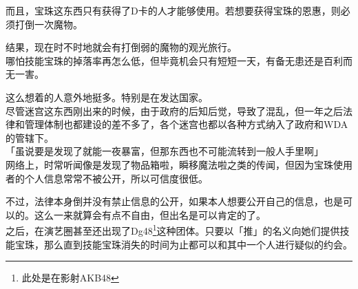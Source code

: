 而且，宝珠这东西只有获得了D卡的人才能够使用。若想要获得宝珠的恩惠，则必须打倒一次魔物。

结果，现在时不时地就会有打倒弱的魔物的观光旅行。\\

哪怕技能宝珠的掉落率再怎么低，但毕竟机会只有短短一天，有备无患还是百利而无一害。

这么想着的人意外地挺多。特别是在发达国家。\\

尽管迷宫这东西刚出来的时候，由于政府的后知后觉，导致了混乱，但一年之后法律和管理体制也都建设的差不多了，各个迷宫也都以各种方式纳入了政府和WDA的管辖下。\\

「虽说要是发现了就能一夜暴富，但那东西也不可能流转到一般人手里啊」\\

网络上，时常听闻像是发现了物品箱啦，瞬移魔法啦之类的传闻，但因为宝珠使用者的个人信息常常不被公开，所以可信度很低。

不过，法律本身倒并没有禁止信息的公开，如果本人想要公开自己的信息，也是可以的。这么一来就算会有点不自由，但出名是可以肯定的了。\\

之后，在演艺圈甚至还出现了Dg48\footnote{此处是在影射AKB48}这种团体。只要以「推」的名义向她们提供技能宝珠，那么直到技能宝珠消失的时间为止都可以和其中一个人进行疑似的约会。

